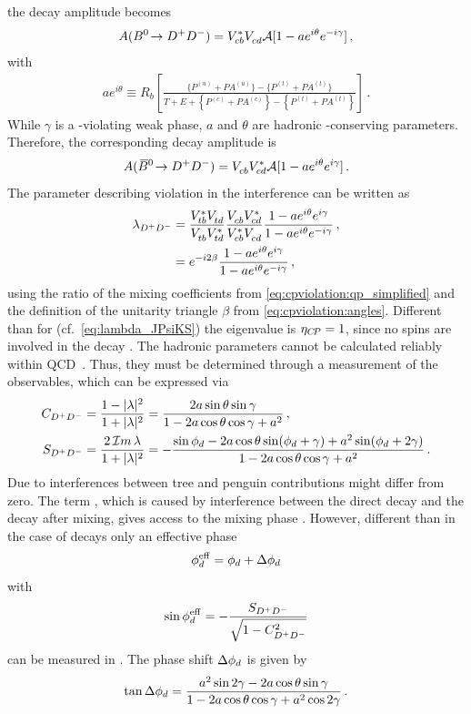 the decay amplitude becomes
\begin{align}
	A({{B}^0}\!\rightarrow {\ensuremath{{D}^+}}{\ensuremath{{D}^-}}) = {V_{{c}{b}}^\ast}{V_{{c}{d}}^{}} \mathcal{A}[1 - ae^{i\theta}e^{-i\gamma}]\,,
\end{align}
with
\begin{align}
	ae^{i\theta} \equiv R_b\left[\frac{\{P^{(u)} + P\!A^{(u)}\} - \{P^{(t)} + P\!A^{(t)}\}}{T + E + \left\{P^{(c)} + P\!A^{(c)}\right\} - \left\{P^{(t)} + P\!A^{(t)}\right\}}\right]\,.
\end{align}
While $\gamma$ is a \CP-violating weak phase, $a$ and $\theta$ are hadronic
\CP-conserving parameters. Therefore, the corresponding \Bzb decay amplitude
is
\begin{align}
	A({{\kern 0.18em\overline{\kern -0.18em B}{}}{}^0}\!\rightarrow {\ensuremath{{D}^+}}{\ensuremath{{D}^-}}) = {V_{{c}{b}}^{}}{V_{{c}{d}}^\ast} \mathcal{A}[1 - ae^{i\theta}e^{i\gamma}]\,.
\end{align}
The parameter describing \CP violation in the interference can be written as
\begin{align}
\begin{split}
	\lambda_{{{D}^+}{{D}^-}} &= \frac{{V_{{t}{b}}^\ast}{V_{{t}{d}}^{}}}{{V_{{t}{b}}^{}}{V_{{t}{d}}^\ast}}\frac{{V_{{c}{b}}^{}}{V_{{c}{d}}^\ast}}{{V_{{c}{b}}^\ast}{V_{{c}{d}}^{}}}\frac{1-ae^{i\theta}e^{i\gamma}}{1-ae^{i\theta}e^{-i\gamma}}\,,\\
					 &= e^{-i2\beta}\frac{1-ae^{i\theta}e^{i\gamma}}{1-ae^{i\theta}e^{-i\gamma}}\,,
\end{split}
\end{align}
using the ratio of the mixing coefficients from
\cref{eq:cpviolation:qp_simplified} and the definition of the unitarity
triangle $\beta$ from \cref{eq:cpviolation:angles}. Different than for
\BdToJPsiKS (cf.~\cref{eq:lambda_JPsiKS}) the \CP eigenvalue is $\eta_{{C\!P}} =
\num{+1}$, since no spins are involved in the decay \BdToDD. The hadronic
parameters cannot be calculated reliably within QCD~\cite{Bel:2015wha}. Thus,
they must be determined through a measurement of the \CP observables, which
can be expressed via
\begin{align}
	C_{{{D}^+}{{D}^-}} &= \frac{1 - |\lambda|^2}{1 + |\lambda|^2} = \frac{2a\sin\theta\sin\gamma}{1 - 2a\cos\theta\cos\gamma + a^2}\,,\\
	S_{{{D}^+}{{D}^-}} &= \frac{2\,\mathcal{I}m\,\lambda}{1 + |\lambda|^2} = -\frac{\sin{\ensuremath{\phi_{{d}}}} - 2a \cos\theta\sin({\phi_{{d}}} + \gamma) + a^2\sin({\phi_{{d}}} + 2\gamma)}{1 - 2a\cos\theta\cos\gamma + a^2}\,.
\end{align}
Due to interferences between tree and penguin contributions \CDD might differ
from zero. The term \SDD, which is caused by interference between the direct
decay and the decay after mixing, gives access to the mixing phase \phid.
However, different than in the case of \BdToJPsiKS decays only an effective
phase
\begin{align}
	\phi_{{d}}^{\mathrm{eff}} = {\phi_{{d}}} + \Delta{\ensuremath{\phi_{{d}}}}
\end{align}
with
\begin{align}
	\sin\phi_{{d}}^{\mathrm{eff}} = -\frac{S_{{{D}^+}{{D}^-}}}{\sqrt{1 - C_{{{D}^+}{{D}^-}}^2}}
\end{align}
can be measured in \BdToDD. The phase shift $\Delta{\ensuremath{\phi_{{d}}}}$ is given by
\begin{align}
	\tan\Delta{\ensuremath{\phi_{{d}}}} = \frac{a^2\sin2\gamma - 2a\cos\theta\sin\gamma}{1 - 2a\cos\theta\cos\gamma + a^2\cos2\gamma}\,.
\end{align}

